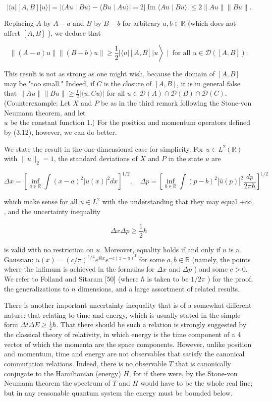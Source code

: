 \documentclass[10pt, letterpaper]{article}
\begin{document}
$$
|\langle u|[A, B]| u\rangle|=|\langle A u \mid B u\rangle-\langle B u \mid A u\rangle|=2| \operatorname{Im}\langle A u \mid B u\rangle \mid \leq 2\|A u\|\|B u\| .
$$

Replacing $A$ by $A-a$ and $B$ by $B-b$ for arbitrary $a, b \in \mathbb{R}$ (which does not affect $[A, B]$ ), we deduce that

$$
\left.\|(A-a) u\|\|(B-b) u\| \geq \frac{1}{2}|\langle u|[A, B]| u\right\rangle \mid \text { for all } u \in \mathcal{D}([A, B]) .
$$

This result is not as strong as one might wish, because the domain of $[A, B]$ may be "too small." Indeed, if $C$ is the closure of $[A, B]$, it is in general false that $\|A u\|\|B u\| \geq \frac{1}{2}|\langle u, C u\rangle|$ for all $u \in \mathcal{D}(A) \cap \mathcal{D}(B) \cap \mathcal{D}(C)$. (Counterexample: Let $X$ and $P$ be as in the third remark following the Stone-von Neumann theorem, and let\\
$u$ be the constant function 1.) For the position and momentum operators defined by (3.12), however, we can do better.

We state the result in the one-dimensional case for simplicity. For $u \in L^{2}(\mathbb{R})$ with $\|u\|_{2}=1$, the standard deviations of $X$ and $P$ in the state $u$ are

$$
\Delta x=\left[\inf _{a \in \mathbb{R}} \int(x-a)^{2}|u(x)|^{2} d x\right]^{1 / 2}, \quad \Delta p=\left[\inf _{b \in \mathbb{R}} \int(p-b)^{2}|\widehat{u}(p)|^{2} \frac{d p}{2 \pi \hbar}\right]^{1 / 2}
$$

which make sense for all $u \in L^{2}$ with the understanding that they may equal $+\infty$, and the uncertainty inequality

$$
\Delta x \Delta p \geq \frac{1}{2} \hbar
$$

is valid with no restriction on $u$. Moreover, equality holds if and only if $u$ is a Gaussian: $u(x)=(c / \pi)^{1 / 4} e^{i b x} e^{-c(x-a)^{2}}$ for some $a, b \in \mathbb{R}$ (namely, the points where the infimum is achieved in the formulas for $\Delta x$ and $\Delta p$ ) and some $c>0$. We refer to Folland and Sitaram [50] (where $\hbar$ is taken to be $1 / 2 \pi$ ) for the proof, the generalizations to $n$ dimensions, and a large assortment of related results.

There is another important uncertainty inequality that is of a somewhat different nature: that relating to time and energy, which is usually stated in the simple form $\Delta t \Delta E \geq \frac{1}{2} \hbar$. That there should be such a relation is strongly suggested by the classical theory of relativity, in which energy is the time component of a 4 vector of which the momenta are the space components. However, unlike position and momentum, time and energy are not observables that satisfy the canonical commutation relations. Indeed, there is no observable $T$ that is canonically conjugate to the Hamiltonian (energy) $H$, for if there were, by the Stone-von Neumann theorem the spectrum of $T$ and $H$ would have to be the whole real line; but in any reasonable quantum system the energy must be bounded below.
\end{document}
